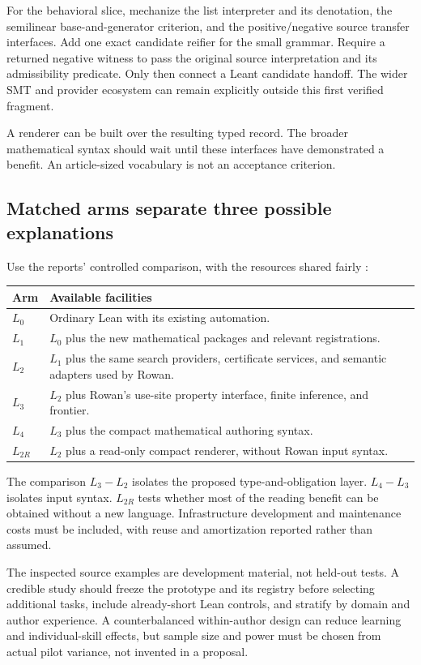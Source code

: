 \documentclass[11pt,letterpaper]{article}
\theoremstyle{definition}\newtheorem{definition}[theorem]{Definition}
\theoremstyle{remark}\newtheorem{remark}[theorem]{Remark}
\begin{document}
For the behavioral slice, mechanize the list interpreter and its denotation,
the semilinear base-and-generator criterion, and the positive/negative source
transfer interfaces. Add one exact candidate reifier for the small grammar.
Require a returned negative witness to pass the original source interpretation
and its admissibility predicate. Only then connect a Leant candidate handoff.
The wider SMT and provider ecosystem can remain explicitly outside this first
verified fragment.

A renderer can be built over the resulting typed record. The broader
mathematical syntax should wait until these interfaces have demonstrated a
benefit. An article-sized vocabulary is not an acceptance criterion.

\subsection{Matched arms separate three possible explanations}
Use the reports' controlled comparison, with the resources shared fairly
\cite{round3a,round3b}:
\begin{center}\small
\begin{tabularx}{\textwidth}{@{}l Y@{}}
\toprule Arm & Available facilities\\\midrule
$L_0$ & Ordinary Lean with its existing automation.\\
$L_1$ & $L_0$ plus the new mathematical packages and relevant registrations.\\
$L_2$ & $L_1$ plus the same search providers, certificate services, and semantic adapters used by Rowan.\\
$L_3$ & $L_2$ plus Rowan's use-site property interface, finite inference, and frontier.\\
$L_4$ & $L_3$ plus the compact mathematical authoring syntax.\\
$L_{2R}$ & $L_2$ plus a read-only compact renderer, without Rowan input syntax.\\
\bottomrule
\end{tabularx}
\end{center}

The comparison $L_3-L_2$ isolates the proposed type-and-obligation layer.
$L_4-L_3$ isolates input syntax. $L_{2R}$ tests whether most of the reading
benefit can be obtained without a new language. Infrastructure development
and maintenance costs must be included, with reuse and amortization reported
rather than assumed.

The inspected source examples are development material, not held-out tests.
A credible study should freeze the prototype and its registry before selecting
additional tasks, include already-short Lean controls, and stratify by domain
and author experience. A counterbalanced within-author design can reduce
learning and individual-skill effects, but sample size and power must be
chosen from actual pilot variance, not invented in a proposal.
\end{document}
